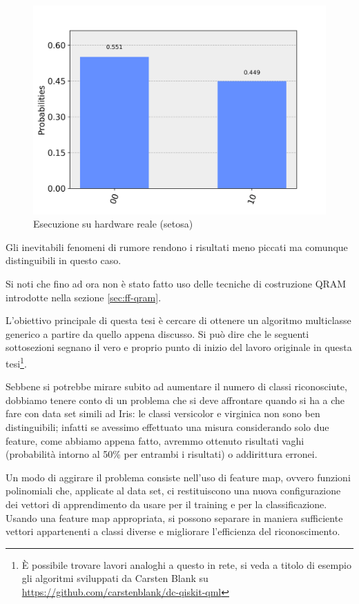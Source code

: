\begin{figure}[h]
    \centering
    \includegraphics[width=\linewidth]{gfx/misura_setosa_sperimentale}
    \caption{Esecuzione su hardware reale (setosa)}
    \label{fig:sperimentale_setosa}
\end{figure}

Gli inevitabili fenomeni di rumore rendono i risultati meno piccati ma comunque 
distinguibili in questo caso. 

Si noti che fino ad ora non è stato fatto uso delle tecniche di costruzione \ac{QRAM} 
introdotte nella sezione \ref{sec:ff-qram}. 

L'obiettivo principale di questa tesi è cercare di ottenere un algoritmo multiclasse generico 
a partire da quello appena discusso. Si può dire che le seguenti sottosezioni segnano il vero e proprio 
punto di inizio del lavoro originale in questa tesi\footnote{È possibile trovare lavori analoghi 
a questo in rete, si veda a titolo di esempio gli algoritmi sviluppati da Carsten Blank su 
\url{https://github.com/carstenblank/dc-qiskit-qml}}. 

Sebbene si potrebbe mirare subito ad aumentare il numero di classi riconosciute, dobbiamo tenere 
conto di un problema che si deve affrontare quando si ha a che fare con data set simili ad Iris: 
le classi versicolor e virginica non sono ben distinguibili; infatti se avessimo effettuato una 
misura considerando solo due feature, come abbiamo appena fatto, avremmo ottenuto risultati vaghi 
(probabilità intorno al 50\% per entrambi i risultati) o addirittura erronei. 

Un modo di aggirare il problema consiste nell'uso di feature map\cite{schuld}, ovvero funzioni polinomiali che, 
applicate al data set, ci restituiscono una nuova configurazione dei vettori di apprendimento da 
usare per il training e per la classificazione. Usando una feature map appropriata, si possono 
separare in maniera sufficiente vettori appartenenti a classi diverse e migliorare l'efficienza 
del riconoscimento. 

